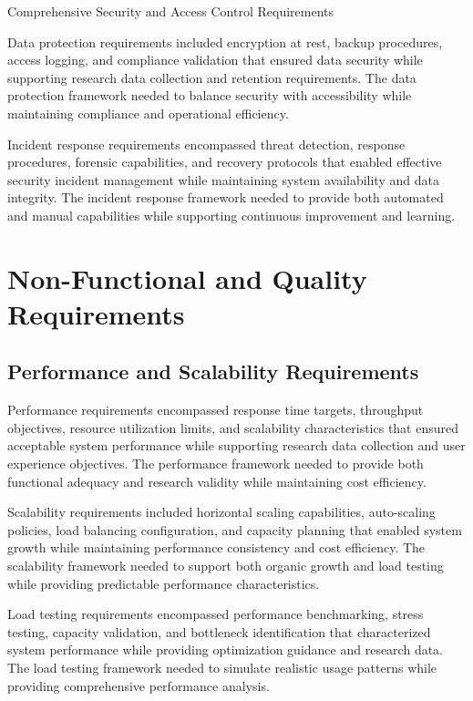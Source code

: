 \begin{table}[H]
\centering
\caption{Comprehensive Security and Access Control Requirements}
\label{tab:security-access-control-framework}
\end{table}

Data protection requirements included encryption at rest, backup procedures, access logging, and compliance validation that ensured data security while supporting research data collection and retention requirements. The data protection framework needed to balance security with accessibility while maintaining compliance and operational efficiency.

Incident response requirements encompassed threat detection, response procedures, forensic capabilities, and recovery protocols that enabled effective security incident management while maintaining system availability and data integrity. The incident response framework needed to provide both automated and manual capabilities while supporting continuous improvement and learning.

\section{Non-Functional and Quality Requirements}

\subsection{Performance and Scalability Requirements}

Performance requirements encompassed response time targets, throughput objectives, resource utilization limits, and scalability characteristics that ensured acceptable system performance while supporting research data collection and user experience objectives. The performance framework needed to provide both functional adequacy and research validity while maintaining cost efficiency.

Scalability requirements included horizontal scaling capabilities, auto-scaling policies, load balancing configuration, and capacity planning that enabled system growth while maintaining performance consistency and cost efficiency. The scalability framework needed to support both organic growth and load testing while providing predictable performance characteristics.

Load testing requirements encompassed performance benchmarking, stress testing, capacity validation, and bottleneck identification that characterized system performance while providing optimization guidance and research data. The load testing framework needed to simulate realistic usage patterns while providing comprehensive performance analysis.

